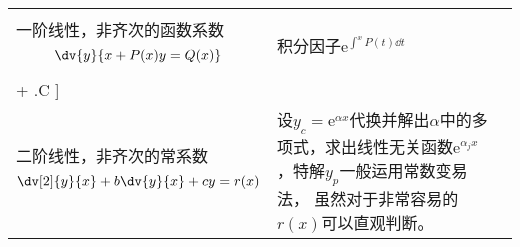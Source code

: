 \begin{fullpage}
\begin{tabularx}{\textwidth}{@{}XXX@{}}
        \midrule
        \rowcolor{gray!40}
        \multicolumn{3}{c}{线性方程}                                                                                                                                                                                                                                                                                                                       \\
        一阶线性，非齐次的函数系数\[ \dv{y}{x + P(x)y = Q(x)} \]                                       & 积分因子$\mathrm{e}^{\int^x P(t)\dd{t}}$                                                                                                                                   &
        \[\begin{split} y = \mathrm{e}^{-\int^x P(s)\dd{s}}\left[\int^x \mathrm{e}^{\int^t P(m)\dd{m}}Q(t)\dd{t}\right.\\ + \left.C \vphantom{\int^x}\right]\end{split} \]                                                                                                                                                                                                                                                                                                                    \\
        \midrule
        二阶线性，非齐次的常系数\[ \dv[2]{y}{x}+b\dv{y}{x} + cy = r(x) \]                              & 设$y_c=\mathrm{e}^{\alpha x}$代换并解出$\alpha$中的多项式，求出线性无关函数$\mathrm{e}^{\alpha_j x}$，特解$y_p$一般运用常数变易法， 虽然对于非常容易的$r(x)$可以直观判断。 &                                                                      \\
        \bottomrule
    \end{tabularx}
\end{fullpage}